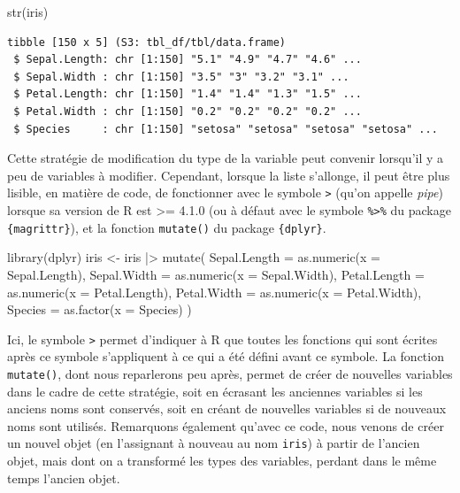 \documentclass[
  letterpaper,
]{book}
\newenvironment{Shaded}{\begin{snugshade}}{\end{snugshade}}
\newcommand{\AttributeTok}[1]{\textcolor[rgb]{0.40,0.45,0.13}{#1}}
\newcommand{\FunctionTok}[1]{\textcolor[rgb]{0.28,0.35,0.67}{#1}}
\newcommand{\NormalTok}[1]{\textcolor[rgb]{0.00,0.23,0.31}{#1}}
\newcommand{\OtherTok}[1]{\textcolor[rgb]{0.00,0.23,0.31}{#1}}
\newcommand{\SpecialCharTok}[1]{\textcolor[rgb]{0.37,0.37,0.37}{#1}}
\begin{document}
\begin{Shaded}
\begin{Highlighting}[]
\FunctionTok{str}\NormalTok{(iris)}
\end{Highlighting}
\end{Shaded}

\begin{verbatim}
tibble [150 x 5] (S3: tbl_df/tbl/data.frame)
 $ Sepal.Length: chr [1:150] "5.1" "4.9" "4.7" "4.6" ...
 $ Sepal.Width : chr [1:150] "3.5" "3" "3.2" "3.1" ...
 $ Petal.Length: chr [1:150] "1.4" "1.4" "1.3" "1.5" ...
 $ Petal.Width : chr [1:150] "0.2" "0.2" "0.2" "0.2" ...
 $ Species     : chr [1:150] "setosa" "setosa" "setosa" "setosa" ...
\end{verbatim}

Cette stratégie de modification du type de la variable peut convenir
lorsqu'il y a peu de variables à modifier. Cependant, lorsque la liste
s'allonge, il peut être plus lisible, en matière de code, de fonctionner
avec le symbole \texttt{\textbar{}\textgreater{}} (qu'on appelle
\emph{pipe}) lorsque sa version de R est \textgreater= 4.1.0 (ou à
défaut avec le symbole \texttt{\%\textgreater{}\%} du package
\texttt{\{magrittr\}}), et la fonction \texttt{mutate()} du package
\texttt{\{dplyr\}}.

\begin{Shaded}
\begin{Highlighting}[]
\FunctionTok{library}\NormalTok{(dplyr)}
\NormalTok{iris }\OtherTok{\textless{}{-}}
\NormalTok{  iris }\SpecialCharTok{|\textgreater{}} 
  \FunctionTok{mutate}\NormalTok{(}
    \AttributeTok{Sepal.Length =} \FunctionTok{as.numeric}\NormalTok{(}\AttributeTok{x =}\NormalTok{ Sepal.Length),}
    \AttributeTok{Sepal.Width =} \FunctionTok{as.numeric}\NormalTok{(}\AttributeTok{x =}\NormalTok{ Sepal.Width),}
    \AttributeTok{Petal.Length =} \FunctionTok{as.numeric}\NormalTok{(}\AttributeTok{x =}\NormalTok{ Petal.Length),}
    \AttributeTok{Petal.Width =} \FunctionTok{as.numeric}\NormalTok{(}\AttributeTok{x =}\NormalTok{ Petal.Width),}
    \AttributeTok{Species =} \FunctionTok{as.factor}\NormalTok{(}\AttributeTok{x =}\NormalTok{ Species)}
\NormalTok{  )}
\end{Highlighting}
\end{Shaded}

Ici, le symbole \texttt{\textbar{}\textgreater{}} permet d'indiquer à R
que toutes les fonctions qui sont écrites après ce symbole s'appliquent
à ce qui a été défini avant ce symbole. La fonction \texttt{mutate()},
dont nous reparlerons peu après, permet de créer de nouvelles variables
dans le cadre de cette stratégie, soit en écrasant les anciennes
variables si les anciens noms sont conservés, soit en créant de
nouvelles variables si de nouveaux noms sont utilisés. Remarquons
également qu'avec ce code, nous venons de créer un nouvel objet (en
l'assignant à nouveau au nom \texttt{iris}) à partir de l'ancien objet,
mais dont on a transformé les types des variables, perdant dans le même
temps l'ancien objet.
\end{document}
